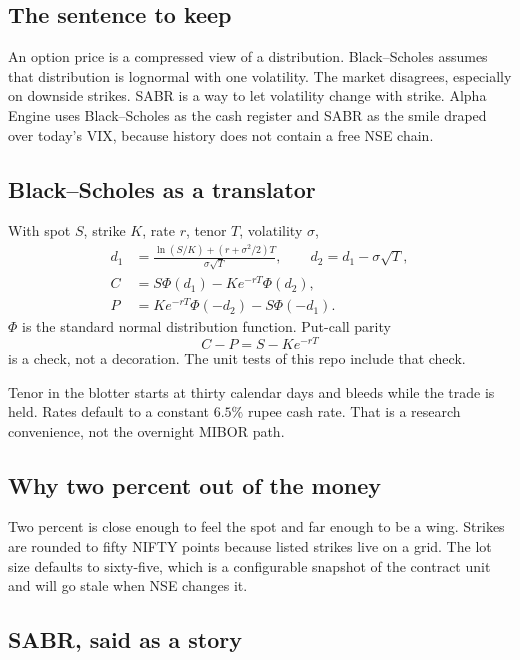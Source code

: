 \documentclass[11pt,a4paper]{article}
\begin{document}
\subsection{The sentence to keep}

An option price is a compressed view of a distribution. Black--Scholes assumes that distribution is lognormal with one volatility. The market disagrees, especially on downside strikes. SABR is a way to let volatility change with strike. Alpha Engine uses Black--Scholes as the cash register and SABR as the smile draped over today's VIX, because history does not contain a free NSE chain.

\subsection{Black--Scholes as a translator}

With spot $S$, strike $K$, rate $r$, tenor $T$, volatility $\sigma$,
\begin{align}
  d_1 &= \frac{\ln(S/K)+(r+\sigma^2/2)T}{\sigma\sqrt{T}},\qquad
  d_2=d_1-\sigma\sqrt{T},\\
  C &= S\Phi(d_1)-Ke^{-rT}\Phi(d_2),\\
  P &= Ke^{-rT}\Phi(-d_2)-S\Phi(-d_1).
\end{align}
$\Phi$ is the standard normal distribution function. Put-call parity
\begin{equation}
  C-P = S-Ke^{-rT}
\end{equation}
is a check, not a decoration. The unit tests of this repo include that check.

Tenor in the blotter starts at thirty calendar days and bleeds while the trade is held. Rates default to a constant $6.5\%$ rupee cash rate. That is a research convenience, not the overnight MIBOR path.

\subsection{Why two percent out of the money}

Two percent is close enough to feel the spot and far enough to be a wing. Strikes are rounded to fifty NIFTY points because listed strikes live on a grid. The lot size defaults to sixty-five, which is a configurable snapshot of the contract unit and will go stale when NSE changes it.

\subsection{SABR, said as a story}
\end{document}
